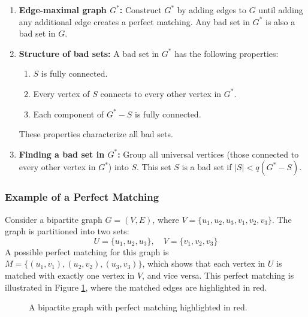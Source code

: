 \begin{enumerate}
    \item \textbf{Edge-maximal graph \( G^* \):} Construct \( G^* \) by adding edges to \( G \) until adding any additional edge creates a perfect matching. Any bad set in \( G^* \) is also a bad set in \( G \).

    \item \textbf{Structure of bad sets:} A bad set in \( G^* \) has the following properties:
    \begin{enumerate}
        \item \( S \) is fully connected.
        \item Every vertex of \( S \) connects to every other vertex in \( G^* \).
        \item Each component of \( G^* - S \) is fully connected.
    \end{enumerate}
    These properties characterize all bad sets.

    \item \textbf{Finding a bad set in \( G^* \):} Group all universal vertices (those connected to every other vertex in \( G^* \)) into \( S \). This set \( S \) is a bad set if \( |S| < q(G^* - S) \).
\end{enumerate}

\subsubsection{Example of a Perfect Matching}

Consider a bipartite graph \( G = (V, E) \), where \( V = \{u_1, u_2, u_3, v_1, v_2, v_3\} \). The graph is partitioned into two sets: \[ U = \{u_1, u_2, u_3\},\quad V = \{v_1, v_2, v_3\} \]
A possible perfect matching for this graph is \( M = \{(u_1, v_1), (u_2, v_2), (u_3, v_3)\} \), which shows that each vertex in \( U \) is matched with exactly one vertex in \( V \), and vice versa. This perfect matching is illustrated in Figure \ref{fig:bipartite_graph}, where the matched edges are highlighted in red.

\begin{figure}[ht]
\centering
{}
\caption{A bipartite graph with perfect matching highlighted in red.}
\label{fig:bipartite_graph}
\end{figure}

